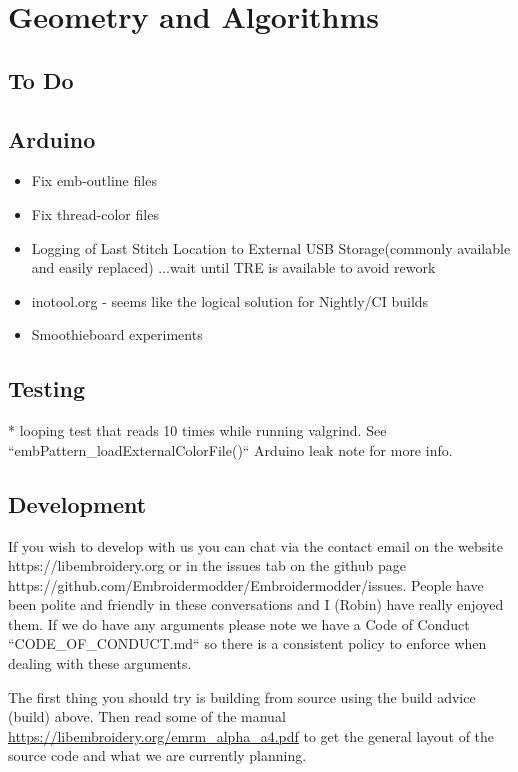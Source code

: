 \documentclass[10pt]{report}
\begin{document}
\section{Geometry and Algorithms}

\subsection{To Do}

\subsection{Arduino}

\begin{itemize}
\item Fix emb-outline files
\item Fix thread-color files
\item Logging of Last Stitch Location to External USB Storage(commonly available and easily replaced) ...wait until TRE is available to avoid rework
\item inotool.org - seems like the logical solution for Nightly/CI builds
\item Smoothieboard experiments
\end{itemize}

\subsection{Testing}

* looping test that reads 10 times while running valgrind. See ``embPattern\_loadExternalColorFile()`` Arduino leak note for more info.

\subsection{Development}

If you wish to develop with us you can chat via the contact email
on the website https://libembroidery.org or in the issues tab on the
github page https://github.com/Embroidermodder/Embroidermodder/issues.
People have been polite and friendly in these conversations and I (Robin)
have really enjoyed them.
If we do have any arguments please note we have a
Code of Conduct ``CODE\_OF\_CONDUCT.md`` so there is a consistent policy to
enforce when dealing with these arguments.

The first thing you should try is building from source using the  build advice (build)
above. Then read some of the  manual
\url{https://libembroidery.org/emrm_alpha_a4.pdf} to get the general
layout of the source code and what we are currently planning.
\end{document}
